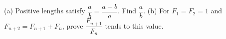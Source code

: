(a) Positive lengths satisfy $\dfrac{a}{b}=\dfrac{a+b}{a}$. Find $\dfrac{a}{b}$. (b) For $F_1=F_2=1$ and $F_{n+2}=F_{n+1}+F_n$, prove $\dfrac{F_{n+1}}{F_n}$ tends to this value.
